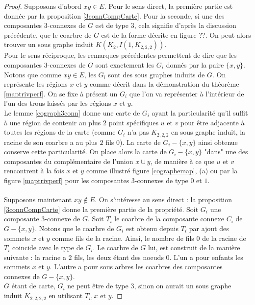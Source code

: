 \documentclass{scrartcl}
\begin{document}
\begin{flushleft}
\begin{proof}
    Supposons d'abord $xy \in E$. Pour le sens direct, la première partie est donnée par la proposition \ref{3connCompCarte}. Pour la seconde,
    si une des composantes $3$-connexes de $G$ est de type $3$, cela signifie d'après la discussion précédente, que le coarbre de $G$
    est de la forme décrite en figure ??. On peut alors trouver un sous graphe induit $K(K_2, I(1, K_{2,2,2}))$.\\
    Pour le sens réciproque, les remarques précédentes permettent de dire que les composantes $3$-connexes de $G$ sont exactement les $G_i$
    donnés par la paire $\{x,y\}$. Notons que comme $xy \in E$, les $G_i$ sont des sous graphes induits de $G$. On représente les régions $x$ et
    $y$ comme décrit dans la démonstration du théorème \ref{maptrivperf}. On se fixe à présent un $G_i$ que l'on va représenter à l'intérieur de
    l'un des trous laissés par les régions $x$ et $y$.\\
    Le lemme \ref{cograph3conn} donne une carte de $G_i$ ayant la particularité qu'il suffit à une région de contenir au plus $2$ point spécifiques
    $u$ et $v$ pour être adjacente à toutes les régions de la carte (comme $G_i$ n'a pas $K_{2,2,2}$ en sous graphe induit, la racine de son coarbre
    a au plus $2$ fils $0$). La carte de $G_i - \{x,y\}$ ainsi obtenue conserve cette particularité. On place alors
    la carte de $G_i - \{x,y\}$ "dans" une des composantes du complémentaire de l'union $x \cup y$, de manière à ce que $u$ et $v$ rencontrent à la fois
    $x$ et $y$ comme illustré figure \ref{cographemap}, (a) ou par la figure \ref{maptrivperf} pour les composantes $3$-connexes de type $0$ et $1$.
    \\~\\
    Supposons maintenant $xy \notin E$. On s'intéresse au sens direct : la proposition \ref{3connCompCarte} donne la première partie de la propriété.
    Soit $G_i$ une composante $3$-connexe de $G$. Soit $T_i$ le coarbre de la composante connexe $C_i$ de $G - \{x,y\}$.
    Notons que le coarbre de $G_i$ est obtenu depuis $T_i$ par ajout des sommets $x$ et $y$ comme fils de la racine. Ainsi, le nombre de fils
    $0$ de la racine de $T_i$ coincide avec le type de $G_i$. Le coarbre de $G$ lui, est construit de la manière suivante : la racine a $2$ fils,
    les deux étant des noeuds $0$. L'un a pour enfants les sommets $x$ et $y$. L'autre a pour sous arbres les coarbres des composantes connexes de
    $G - \{x,y\}$.\\
    $G$ étant de carte, $G_i$ ne peut être de type $3$, sinon on aurait un sous graphe induit $K_{2,2,2,2}$ en utilisant $T_i, x$ et $y$.

\end{proof}
\end{flushleft}
\end{document}
